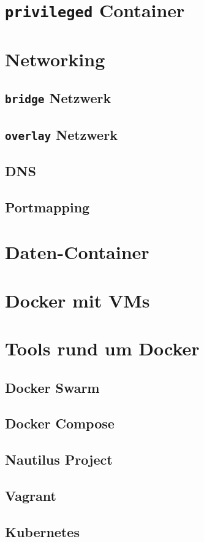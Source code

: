 \documentclass[11pt,a4paper,oneside]{report}
\begin{document}
	\section{\texttt{privileged} Container}
	\section{Networking}
		\subsection{\texttt{bridge} Netzwerk}
		\subsection{\texttt{overlay} Netzwerk}
		\subsection{DNS}
		\subsection{Portmapping}
	\section{Daten-Container}
	\section{Docker mit VMs}
	\section{Tools rund um Docker}
		\subsection{Docker Swarm}
		\subsection{Docker Compose}
		\subsection{Nautilus Project}
		\subsection{Vagrant}
		\subsection{Kubernetes}
\end{document}
